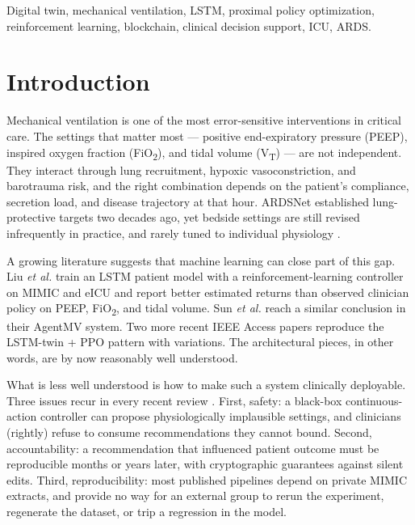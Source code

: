 \documentclass[conference]{IEEEtran}
\begin{document}
\begin{IEEEkeywords}
Digital twin, mechanical ventilation, LSTM, proximal policy optimization, reinforcement learning, blockchain, clinical decision support, ICU, ARDS.
\end{IEEEkeywords}

\section{Introduction}
Mechanical ventilation is one of the most error-sensitive interventions in critical care. The settings that matter most --- positive end-expiratory pressure (PEEP), inspired oxygen fraction (FiO\textsubscript{2}), and tidal volume (V\textsubscript{T}) --- are not independent. They interact through lung recruitment, hypoxic vasoconstriction, and barotrauma risk, and the right combination depends on the patient's compliance, secretion load, and disease trajectory at that hour. ARDSNet \cite{ardsnet2000} established lung-protective targets two decades ago, yet bedside settings are still revised infrequently in practice, and rarely tuned to individual physiology \cite{liu2024rl}.

A growing literature suggests that machine learning can close part of this gap. Liu \emph{et al.} \cite{liu2024rl} train an LSTM patient model with a reinforcement-learning controller on MIMIC and eICU and report better estimated returns than observed clinician policy on PEEP, FiO\textsubscript{2}, and tidal volume. Sun \emph{et al.} \cite{sun2024agentmv} reach a similar conclusion in their AgentMV system. Two more recent IEEE Access papers \cite{access2024_lstm_ppo,access2024_lstm_dt_ppo} reproduce the LSTM-twin + PPO pattern with variations. The architectural pieces, in other words, are by now reasonably well understood.

What is less well understood is how to make such a system clinically deployable. Three issues recur in every recent review \cite{riahi2025dt_scoping,salahuddin2025bc_dt_review,rahman2024cphs}. First, safety: a black-box continuous-action controller can propose physiologically implausible settings, and clinicians (rightly) refuse to consume recommendations they cannot bound. Second, accountability: a recommendation that influenced patient outcome must be reproducible months or years later, with cryptographic guarantees against silent edits. Third, reproducibility: most published pipelines depend on private MIMIC extracts, and provide no way for an external group to rerun the experiment, regenerate the dataset, or trip a regression in the model.
\end{document}

